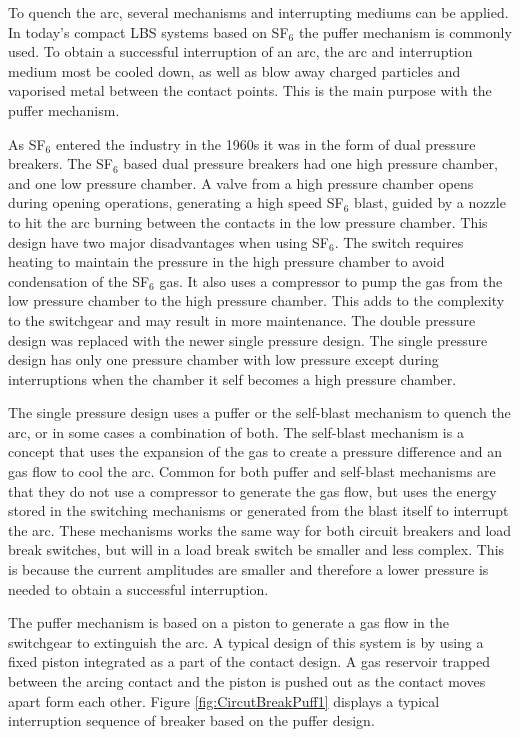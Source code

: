 \documentclass[10pt,a4paper,twoside]{article}
\begin{document}
To quench the arc, several mechanisms and interrupting mediums can be applied. In today's compact LBS systems based on SF$_6$ the puffer mechanism is commonly used. To obtain a successful interruption of an arc, the arc and interruption medium most be cooled down, as well as blow away charged particles and vaporised metal between the contact points. This is the main purpose with the puffer mechanism. 

As SF$_6$ entered the industry in the 1960s it was in the form of dual pressure breakers. The SF$_6$ based dual pressure breakers had one high pressure chamber, and one low pressure chamber. A valve from a high pressure chamber opens during opening operations, generating a high speed SF$_6$ blast, guided by a nozzle to hit the arc burning between the contacts in the low pressure chamber. This design have two major disadvantages when using SF$_6$. The switch requires heating to maintain the pressure in the high pressure chamber to avoid condensation of the SF$_6$ gas. It also uses a compressor to pump the gas from the low pressure chamber to the high pressure chamber. This adds to the complexity to the switchgear and may result in more maintenance. The double pressure design was replaced with the newer single pressure design. The single pressure design has only one pressure chamber with low pressure except during interruptions when the chamber it self becomes a high pressure chamber.

The single pressure design uses a puffer or the self-blast mechanism to quench the arc, or in some cases a combination of both. The self-blast mechanism is a concept that uses the expansion of the gas to create a pressure difference and an gas flow to cool the arc. Common for both puffer and self-blast mechanisms are that they do not use a compressor to generate the gas flow, but uses the energy stored in the switching mechanisms or generated from the blast itself to interrupt the arc. These mechanisms works the same way for both circuit breakers and load break switches, but will in a load break switch be smaller and less complex. This is because the current amplitudes are smaller and therefore a lower pressure is needed to obtain a successful interruption.

The puffer mechanism is based on a piston to generate a gas flow in the switchgear to extinguish the arc. A typical design of this system is by using a fixed piston integrated as a part of the contact design. A gas reservoir trapped between the arcing contact and the piston is pushed out as the contact moves apart form each other. Figure \ref{fig:CircutBreakPuff1} displays a typical interruption sequence of breaker based on the puffer design.
\end{document}
